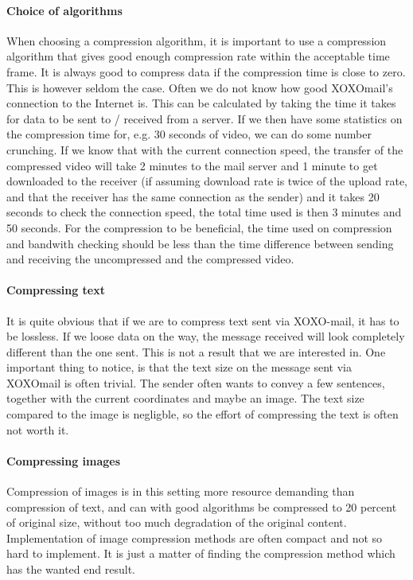 \paragraph{Choice of algorithms}\hfill
\newline
When choosing a compression algorithm, it is important to use a compression algorithm that gives good enough compression rate within the acceptable time frame. It is always good to compress data if the compression time is close to zero. This is however seldom the case.
\newline
\newline
Often we do not know how good XOXOmail's connection to the Internet is. This can be calculated by taking the time it takes for data to be sent to / received from a server. If we then have some statistics on the compression time for, e.g. 30 seconds of video, we can do some number crunching. If we know that with the current connection speed, the transfer of the compressed video will take 2 minutes to the mail server and 1 minute to get downloaded to the receiver (if assuming download rate is twice of the upload rate, and that the receiver has the same connection as the sender) and it takes 20 seconds to check the connection speed, the total time used is then 3 minutes and 50 seconds. For the compression to be beneficial, the time used on compression and bandwith checking should be less than the time difference between sending and receiving the uncompressed and the compressed video.

\paragraph{Compressing text} \hfill
\newline
It is quite obvious that if we are to compress text sent via XOXO-mail, it has to be lossless. If we loose data on the way, the message received will look completely different than the one sent. This is not a result that we are interested in. One important thing to notice, is that the text size on the message sent via XOXOmail is often trivial. The sender often wants to convey a few sentences, together with the current coordinates and maybe an image. The text size compared to the image is negligble, so the effort of compressing the text is often not worth it.

\paragraph{Compressing images} \hfill
\newline
Compression of images is in this setting more resource demanding than compression of text, and can with good algorithms be compressed to 20 percent of original size, without too much degradation of the original content. Implementation of image compression methods are often compact and not so hard to implement. It is just a matter of finding the compression method which has the wanted end result.

